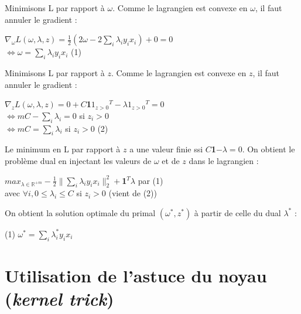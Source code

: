 \documentclass{article}
\begin{document}
Minimisons L par rapport à $\omega$. Comme le lagrangien est convexe en $\omega$, il faut annuler le gradient :\\

              \begin{center}
              $\nabla_{\omega} L(\omega, \lambda, z) = \frac{1}{2}(2\omega - 2\sum_i \lambda_iy_ix_i) + 0 = 0$\\
              $\Leftrightarrow \omega = \sum_i \lambda_iy_ix_i$ (1)\\
              \end{center}

Minimisons L par rapport à $z$. Comme le lagrangien est convexe en $z$, il faut annuler le gradient :\\

              \begin{center}
              $\nabla_{z} L(\omega, \lambda, z) = 0 + C$\textbf{1}\textbf{$1_{z>0}$}$^T - \lambda$\textbf{$1_{z>0}$}$^T = 0$\\
              $\Leftrightarrow mC - \sum_i \lambda_i = 0$ si $z_i > 0$\\
              $\Leftrightarrow mC = \sum_i \lambda_i$ si $z_i > 0$ (2)\\
              \end{center}

Le minimum en L par rapport à $z$ a une valeur finie ssi $C$\textbf{1}$ - \lambda = 0$. On obtient le problème dual en injectant les valeurs de $\omega$ et de $z$ dans le lagrangien :\\

             \begin{center}
             $max_{\lambda \in \mathbb{R}^{+m}} -\frac{1}{2}\|\sum_i\lambda_iy_ix_i\|^2_2 + $\textbf{1}$^T\lambda$ par (1)\\ 
             avec $\forall i, 0 \leq \lambda_i \leq C$ si $z_i > 0$ (vient de (2))\\
             \end{center}

On obtient la solution optimale du primal $(\omega^*, z^*)$ à partir de celle du dual $\lambda^*$ :

             \begin{center}
             (1) $\omega^{*} = \sum_i \lambda^{*}_i y_i x_i$
             \end{center}

\section{Utilisation de l'astuce du noyau (\emph{kernel trick})}
\end{document}
